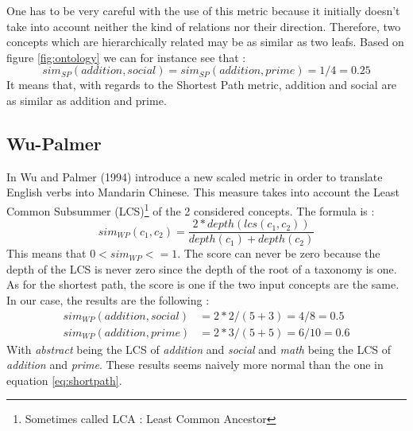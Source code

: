 One has to be very careful with the use of this metric because it initially doesn't take into account neither the kind of relations nor their direction. Therefore, two concepts which are hierarchically related may be as similar as two leafs. Based on figure \ref{fig:ontology} we can for instance see that :
\begin{equation}
\label{eq:shortpath}
sim_{SP}(addition, social) = sim_{SP}(addition, prime) = 1/4 = 0.25
\end{equation}
It means that, with regards to the Shortest Path metric, addition and social are as similar as addition and prime.

\subsection{Wu-Palmer} %
\label{ssub:wu_palmer}
In \cite{wu1994verbs} Wu and Palmer (1994) introduce a new scaled metric in order to translate English verbs into Mandarin Chinese. This measure takes into account the Least Common Subsummer (LCS)\footnote{Sometimes called LCA : Least Common Ancestor} of the 2 considered concepts. The formula is :
\begin{equation}
\label{eq:wupalmer}
sim_{WP}(c_1, c_2) = \frac{2*depth(lcs(c_1,c_2))}{depth(c_1) + depth(c_2)}
\end{equation}
This means that $0 < sim_{WP} <= 1$. The score can never be zero because the depth of the LCS is never zero since the depth of the root of a taxonomy is one. As for the shortest path, the score is one if the two input concepts are the same.\\
In our case, the results are the following :
\begin{align}
\label{eq:resultsWP}
sim_{WP}(addition, social)& = 2*2 / (5 + 3) = 4/8 = 0.5\\
sim_{WP}(addition, prime)& = 2*3 / (5 + 5) = 6/10 = 0.6
\end{align}
With \textit{abstract} being the LCS of \textit{addition} and \textit{social} and \textit{math} being the LCS of \textit{addition} and \textit{prime}. These results seems naively more normal than the one in equation \eqref{eq:shortpath}.\\

